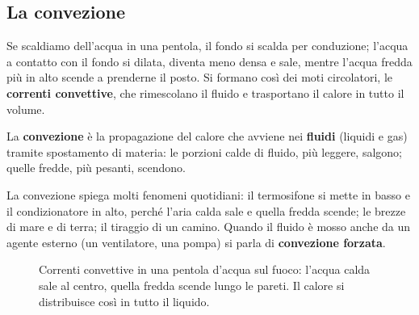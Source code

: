 \subsection{La convezione}

Se scaldiamo dell'acqua in una pentola, il fondo si scalda per conduzione; l'acqua a contatto con il fondo si dilata, diventa meno densa e sale, mentre l'acqua fredda più in alto scende a prenderne il posto. Si formano così dei moti circolatori, le \textbf{correnti convettive}, che rimescolano il fluido e trasportano il calore in tutto il volume.

\begin{definizione}
La \textbf{convezione} è la propagazione del calore che avviene nei \textbf{fluidi} (liquidi e gas) tramite spostamento di materia: le porzioni calde di fluido, più leggere, salgono; quelle fredde, più pesanti, scendono.
\end{definizione}

La convezione spiega molti fenomeni quotidiani: il termosifone si mette in basso e il condizionatore in alto, perché l'aria calda sale e quella fredda scende; le brezze di mare e di terra; il tiraggio di un camino. Quando il fluido è mosso anche da un agente esterno (un ventilatore, una pompa) si parla di \textbf{convezione forzata}.

\begin{figure}[!htbp]
    \centering
    \caption{Correnti convettive in una pentola d'acqua sul fuoco: l'acqua calda sale al centro, quella fredda scende lungo le pareti. Il calore si distribuisce così in tutto il liquido.}
    \label{fig:convezione}
\end{figure}

